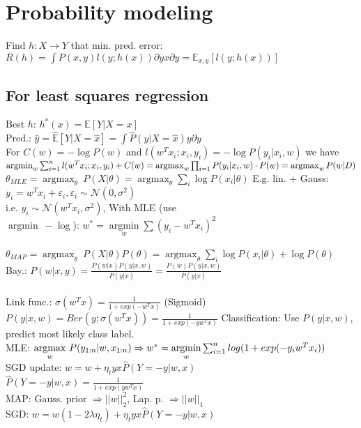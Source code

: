 \section*{Probability modeling}
Find $h:X\rightarrow Y$ that min. pred. error: 
$R(h) = \int P(x,y)l(y;h(x)) \partial yx \partial y = \mathbb{E}_{x,y}[l(y;h(x))]$

\subsection*{For least squares regression}
Best $h$: $h^*(x) = \mathbb{E}[Y|X=x]$ \\
Pred.: $\hat{y} = \hat{\mathbb{E}}[Y|X=\hat{x}] = \int \hat{P}(y|X=\hat{x}) y \partial y$\\
For $C(w) = - \log P(w)$ and $l(w^Tx_i;x_i,y_i) = - \log P(y_i|x_i,w)$ we have 
$\operatorname{argmin}_{w} \sum_{i=1}^{n} l (w^T x_i; x_i,y_i) + C(w) = \operatorname{argmax}_{w} \prod_{i=1} P(y_i|x_i,w) \cdot P(w) =  \operatorname{argmax}_{w} P(w|D)$\\
$\theta_{MLE} = \operatorname{argmax}_\theta ~ {P}(X| \theta) = \operatorname{argmax}_{\theta} \sum_i \log P(x_i|\theta)$ 
E.g. lin. + Gauss: $y_i = w^T x_i + \varepsilon_i, \varepsilon_i \sim \mathcal{N}(0, \sigma^2)$\\
i.e. $y_i \sim \mathcal{N}(w^T x_i, \sigma^2)$, With MLE (use\\ $\operatorname{argmin} ~ - \operatorname{log}$): $w^* = \underset{w}{\operatorname{argmin}} \sum (y_i-w^Tx_i)^2$\\
\\
$\theta_{MAP} = \operatorname{argmax}_\theta ~ {P}(X| \theta) P(\theta) = \operatorname{argmax}_{\theta} \sum_i \log P(x_i|\theta) + \log P(\theta)$
Bay.: $P(w|x,y) = \frac{P(w|x) P(y|x,w)}{P(y|x)} = \frac{P(w) P(y|x,w)}{P(y|x)}$\\
\\
Link func.: $\sigma(w^Tx) = \frac{1}{1+exp(-w^Tx)}$ (Sigmoid)\\
$P(y|x,w) = Ber(y; \sigma(w^Tx)) = \frac{1}{1+exp(-y w^T x)}$
Classification: Use $P(y|x,w)$, predict most likely class label.\\
MLE: $\underset{w}{\operatorname{argmax}} ~ P(y_{1:n}|w,x_{1:n})\\
\Rightarrow w^* = \underset{w}{\operatorname{argmin}} \sum_{i=1}^n log(1+exp(-y_i w^T x_i))$\\
SGD update: $w = w + \eta_t y x \hat{P}(Y = -y|w,x)$\\
$\hat{P}(Y = -y|w,x) = \frac{1}{1+exp(yw^Tx)}$\\
MAP: Gauss. prior $\Rightarrow ||w||_2^2$, Lap. p. $\Rightarrow||w||_1$\\
SGD: $w = w (1-2\lambda \eta_t) + \eta_t y x \hat{P}(Y = -y|w,x)$
